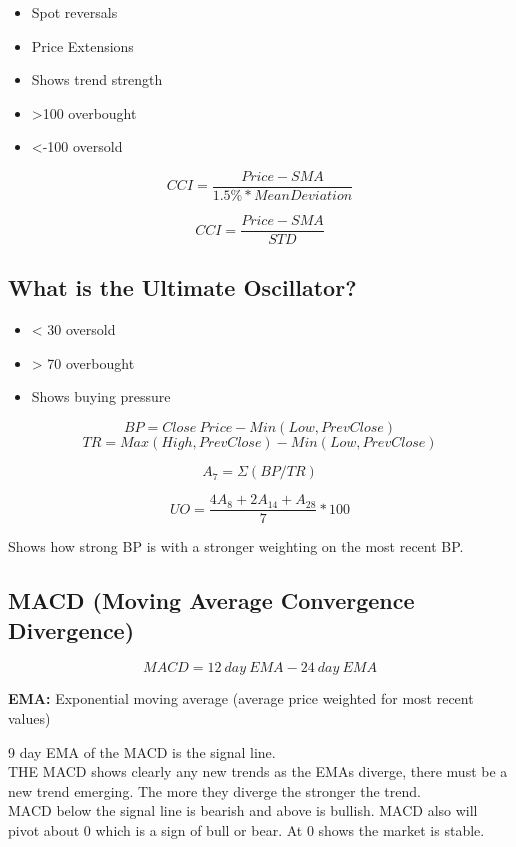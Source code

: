 \documentclass[11pt]{scrartcl} %
\begin{document}
\begin{itemize}
	\item Spot reversals
	\item Price Extensions
	\item Shows trend strength
	\item >100 overbought
	\item <-100 oversold
\end{itemize}

\[ CCI = \frac{Price - SMA}{1.5\% * Mean Deviation} \]

\[ CCI = \frac{Price - SMA}{STD} \]

\subsection{What is the Ultimate Oscillator?}

\begin{itemize}
	\item < 30 oversold
	\item > 70 overbought
	\item Shows buying pressure
\end{itemize}

\[ BP = Close\:Price - Min(Low,Prev Close) \]
\[ TR = Max(High,Prev Close) - Min(Low, Prev Close) \]

\[ A_7 = \Sigma(BP/TR) \]

\[ UO = \frac{4A_8 + 2A_{14} + A_{28}}{7} *100 \]

Shows how strong BP is with a stronger weighting on the most recent BP.

\subsection{MACD (Moving Average Convergence Divergence)}

\[ MACD = 12\:day\:EMA - 24\:day\:EMA \] 

\textbf{EMA:} Exponential moving average (average price weighted for most recent values)

9 day EMA of the MACD is the signal line.\\

THE MACD shows clearly any new trends as the EMAs diverge, there must be a new trend emerging. The 
more they diverge the stronger the trend.\\

MACD below the signal line is bearish and above is bullish. MACD also will pivot about 0 which is a sign
of bull or bear. At 0 shows the market is stable.
\end{document}
